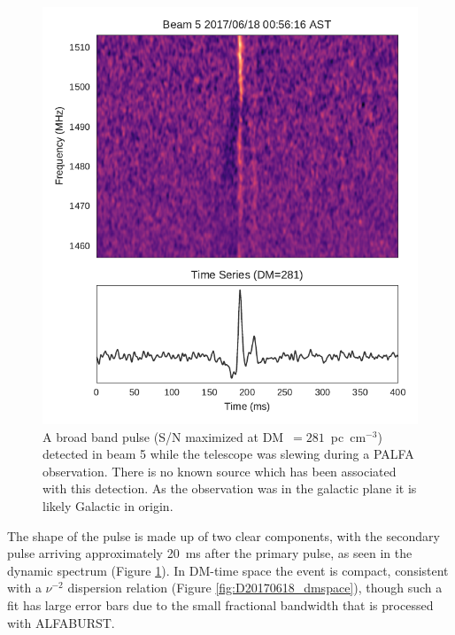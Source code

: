 \documentclass[a4paper,fleqn,usenatbib]{mnras}
\begin{document}
\begin{figure}
    \includegraphics[width=1.0\linewidth]{figures/Beam5_fb_D20170618T005616_buffer2_spectrum.pdf}
    \caption{A broad band pulse (S/N maximized at DM~$=281$~pc~cm$^{-3}$)
    detected in beam 5 while the telescope was slewing during a PALFA
    observation. There is no known source which has been associated with this
    detection. As the observation was in the galactic plane it is likely
    Galactic in origin.
    }
    \label{fig:D20170618_spectrum}
\end{figure}

The shape of the pulse is made up of two clear components, with the secondary
pulse arriving approximately 20~ms after the primary pulse, as seen in the
dynamic spectrum (Figure \ref{fig:D20170618_spectrum}). In DM-time space the
event is compact, consistent with a $\nu^{-2}$ dispersion relation (Figure
\ref{fig:D20170618_dmspace}), though such a fit has large error bars due to the
small fractional bandwidth that is processed with ALFABURST.
\end{document}
